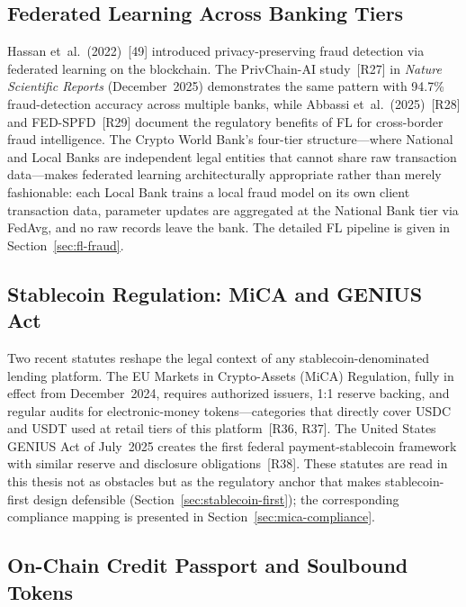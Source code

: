\documentclass[12pt,a4paper]{report}
\begin{document}
\subsection{Federated Learning Across Banking Tiers}
\label{sec:lit-fl}

Hassan et~al.~(2022)~[49] introduced privacy-preserving fraud detection via federated learning on the blockchain. The PrivChain-AI study~[R27] in \textit{Nature Scientific Reports} (December~2025) demonstrates the same pattern with 94.7\% fraud-detection accuracy across multiple banks, while Abbassi et~al.~(2025)~[R28] and FED-SPFD~[R29] document the regulatory benefits of FL for cross-border fraud intelligence. The Crypto World Bank's four-tier structure---where National and Local Banks are independent legal entities that cannot share raw transaction data---makes federated learning architecturally appropriate rather than merely fashionable: each Local Bank trains a local fraud model on its own client transaction data, parameter updates are aggregated at the National Bank tier via FedAvg, and no raw records leave the bank. The detailed FL pipeline is given in Section~\ref{sec:fl-fraud}.

\subsection{Stablecoin Regulation: MiCA and GENIUS Act}
\label{sec:lit-stablecoin-reg}

Two recent statutes reshape the legal context of any stablecoin-denominated lending platform. The EU Markets in Crypto-Assets (MiCA) Regulation, fully in effect from December~2024, requires authorized issuers, 1{:}1 reserve backing, and regular audits for electronic-money tokens---categories that directly cover USDC and USDT used at retail tiers of this platform~[R36, R37]. The United States GENIUS Act of July~2025 creates the first federal payment-stablecoin framework with similar reserve and disclosure obligations~[R38]. These statutes are read in this thesis not as obstacles but as the regulatory anchor that makes stablecoin-first design defensible (Section~\ref{sec:stablecoin-first}); the corresponding compliance mapping is presented in Section~\ref{sec:mica-compliance}.

\subsection{On-Chain Credit Passport and Soulbound Tokens}
\label{sec:lit-sbt}
\end{document}
